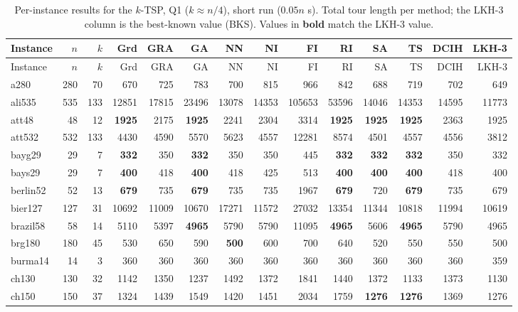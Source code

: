 {\footnotesize\setlength{\tabcolsep}{3pt}
\begin{longtable}{l r r r r r r r r r r r r r}
\caption{Per-instance results for the $k$-TSP, Q1 ($k\approx n/4$), short run ($0.05n$ s). Total tour length per method; the LKH-3 column is the best-known value (BKS). Values in \textbf{bold} match the LKH-3 value.}\label{tab:app_sr_small}\\
\hline Instance & $n$ & $k$ & Grd & GRA & GA & NN & NI & FI & RI & SA & TS & DCIH & LKH-3 \\ \hline \endfirsthead
\hline Instance & $n$ & $k$ & Grd & GRA & GA & NN & NI & FI & RI & SA & TS & DCIH & LKH-3 \\ \hline \endhead
\hline \endfoot
a280 & 280 & 70 & 670 & 725 & 783 & 700 & 815 & 966 & 842 & 688 & 719 & 702 & 649 \\
ali535 & 535 & 133 & 12851 & 17815 & 23496 & 13078 & 14353 & 105653 & 53596 & 14046 & 14353 & 14595 & 11773 \\
att48 & 48 & 12 & \textbf{1925} & 2175 & \textbf{1925} & 2241 & 2304 & 3314 & \textbf{1925} & \textbf{1925} & \textbf{1925} & 2363 & 1925 \\
att532 & 532 & 133 & 4430 & 4590 & 5570 & 5623 & 4557 & 12281 & 8574 & 4501 & 4557 & 4556 & 3812 \\
bayg29 & 29 & 7 & \textbf{332} & 350 & \textbf{332} & 350 & 350 & 445 & \textbf{332} & \textbf{332} & \textbf{332} & 350 & 332 \\
bays29 & 29 & 7 & \textbf{400} & 418 & \textbf{400} & 418 & 425 & 513 & \textbf{400} & \textbf{400} & \textbf{400} & 418 & 400 \\
berlin52 & 52 & 13 & \textbf{679} & 735 & \textbf{679} & 735 & 735 & 1967 & \textbf{679} & 720 & \textbf{679} & 735 & 679 \\
bier127 & 127 & 31 & 10692 & 11009 & 10670 & 17271 & 11572 & 27032 & 13354 & 11344 & 10818 & 11994 & 10619 \\
brazil58 & 58 & 14 & 5110 & 5397 & \textbf{4965} & 5790 & 5790 & 11095 & \textbf{4965} & 5606 & \textbf{4965} & 5790 & 4965 \\
brg180 & 180 & 45 & 530 & 650 & 590 & \textbf{500} & 600 & 700 & 640 & 520 & 550 & 550 & 500 \\
burma14 & 14 & 3 & 360 & 360 & 360 & 360 & 360 & 360 & 360 & 360 & 360 & 360 & 359 \\
ch130 & 130 & 32 & 1142 & 1350 & 1237 & 1492 & 1372 & 1841 & 1440 & 1372 & 1133 & 1373 & 1130 \\
ch150 & 150 & 37 & 1324 & 1439 & 1549 & 1420 & 1451 & 2034 & 1759 & \textbf{1276} & \textbf{1276} & 1369 & 1276 \\

\end{longtable}}
